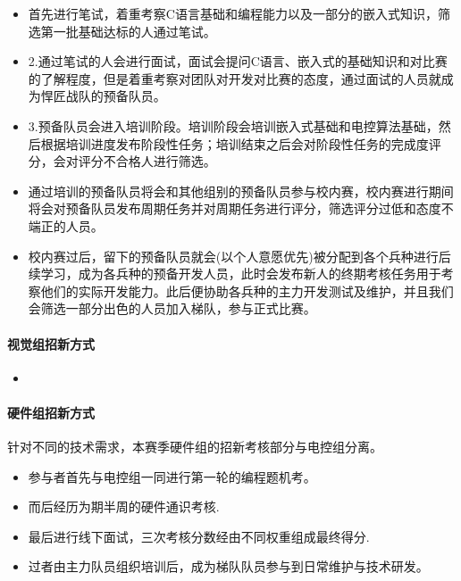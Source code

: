                 \begin{itemize}
                    \item 首先进行笔试，着重考察C语言基础和编程能力以及一部分的嵌入式知识，筛选第一批基础达标的人通过笔试。
                    \item 2.通过笔试的人会进行面试，面试会提问C语言、嵌入式的基础知识和对比赛的了解程度，但是着重考察对团队对开发对比赛的态度，通过面试的人员就成为悍匠战队的预备队员。
                    \item 3.预备队员会进入培训阶段。培训阶段会培训嵌入式基础和电控算法基础，然后根据培训进度发布阶段性任务；培训结束之后会对阶段性任务的完成度评分，会对评分不合格人进行筛选。
                    \item 通过培训的预备队员将会和其他组别的预备队员参与校内赛，校内赛进行期间将会对预备队员发布周期任务并对周期任务进行评分，筛选评分过低和态度不端正的人员。
                    \item 校内赛过后，留下的预备队员就会(以个人意愿优先)被分配到各个兵种进行后续学习，成为各兵种的预备开发人员，此时会发布新人的终期考核任务用于考察他们的实际开发能力。此后便协助各兵种的主力开发测试及维护，并且我们会筛选一部分出色的人员加入梯队，参与正式比赛。
                \end{itemize}

            \paragraph{视觉组招新方式}


                \begin{itemize}
                    \item 
                \end{itemize}

            \paragraph{硬件组招新方式}

                针对不同的技术需求，本赛季硬件组的招新考核部分与电控组分离。


                \begin{itemize}
                    \item 参与者首先与电控组一同进行第一轮的编程题机考。
                    \item 而后经历为期半周的硬件通识考核.
                    \item 最后进行线下面试，三次考核分数经由不同权重组成最终得分.
                    \item 过者由主力队员组织培训后，成为梯队队员参与到日常维护与技术研发。
                \end{itemize}

